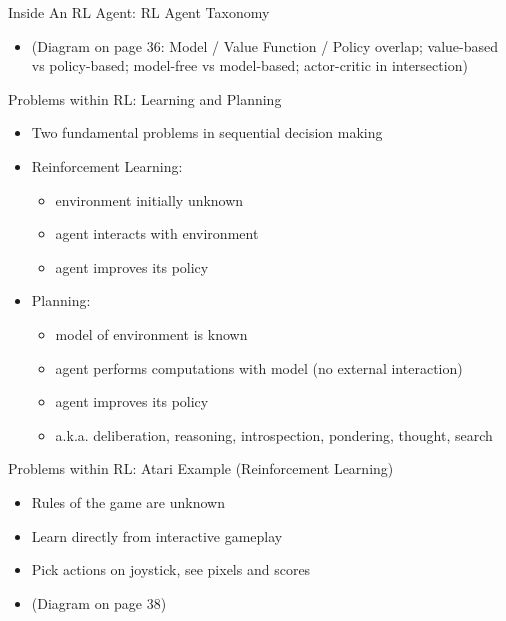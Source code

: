 \documentclass[presentation]{beamer}
\begin{document}
\begin{frame}[label={sec:org4ff1250}]{Inside An RL Agent: RL Agent Taxonomy}
\begin{itemize}
\item (Diagram on page 36: Model / Value Function / Policy overlap; value-based vs policy-based; model-free vs model-based; actor-critic in intersection)
\end{itemize}
\end{frame}
\begin{frame}[label={sec:org99d27a1}]{Problems within RL: Learning and Planning}
\begin{itemize}
\item Two fundamental problems in sequential decision making
\item Reinforcement Learning:
\begin{itemize}
\item environment initially unknown
\item agent interacts with environment
\item agent improves its policy
\end{itemize}
\item Planning:
\begin{itemize}
\item model of environment is known
\item agent performs computations with model (no external interaction)
\item agent improves its policy
\item a.k.a. deliberation, reasoning, introspection, pondering, thought, search
\end{itemize}
\end{itemize}
\end{frame}
\begin{frame}[label={sec:org49239df}]{Problems within RL: Atari Example (Reinforcement Learning)}
\begin{itemize}
\item Rules of the game are unknown
\item Learn directly from interactive gameplay
\item Pick actions on joystick, see pixels and scores
\item (Diagram on page 38)
\end{itemize}
\end{frame}
\end{document}
